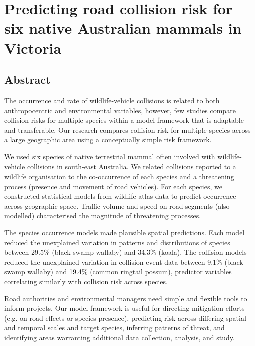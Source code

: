 \chapter{Predicting road collision risk for six native Australian mammals in Victoria}\label{sec:6sp}
\newpage

\begin{localsize}{10}
\section*{\centering Abstract}

The occurrence and rate of wildlife-vehicle collisions is related to both anthropocentric and environmental variables, however, few studies compare collision risks for multiple species within a model framework that is adaptable and transferable.  Our research compares collision risk for multiple species across a large geographic area using a conceptually simple risk framework.

We used six species of native terrestrial mammal often involved with wildlife-vehicle collisions in south-east Australia.  We related collisions reported to a wildlife organisation to the co-occurrence of each species and a threatening process (presence and movement of road vehicles). For each species, we constructed statistical models from wildlife atlas data to predict occurrence across geographic space. Traffic volume and speed on road segments (also modelled) characterised the magnitude of threatening processes.

The species occurrence models made plausible spatial predictions. Each model reduced the unexplained variation in patterns and distributions of species between 29.5\% (black swamp wallaby) and 34.3\% (koala). The collision models reduced the unexplained variation in collision event data between 9.1\% (black swamp wallaby) and 19.4\% (common ringtail possum), predictor variables correlating similarly with collision risk across species.

Road authorities and environmental managers need simple and flexible tools to inform projects. Our model framework is useful for directing mitigation efforts (e.g. on road effects or species presence), predicting risk across differing spatial and temporal scales and target species, inferring patterns of threat, and identifying areas warranting additional data collection, analysis, and study.

\end{localsize}

